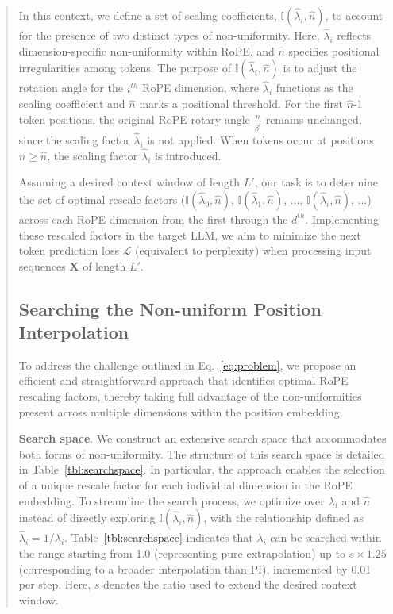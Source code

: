 \begin{abstract}
In this context, we define a set of scaling coefficients, $\mathbb{I}(\hat{\lambda}_{i},\hat{n})$, to account for the presence of two distinct types of non-uniformity. Here, $\hat{\lambda}_i$ reflects dimension-specific non-uniformity within RoPE, and $\hat{n}$ specifies positional irregularities among tokens. The purpose of $\mathbb{I}(\hat{\lambda}_{i},\hat{n})$ is to adjust the rotation angle for the $i^{th}$ RoPE dimension, where $\hat\lambda_{i}$ functions as the scaling coefficient and $\hat{n}$ marks a positional threshold. For the first $\hat{n}$-1 token positions, the original RoPE rotary angle $\frac{n}{\beta^i}$ remains unchanged, since the scaling factor $\hat\lambda_{i}$ is not applied. When tokens occur at positions $n\ge\hat{n}$, the scaling factor $\hat\lambda_{i}$ is introduced.

Assuming a desired context window of length $L'$, our task is to determine the set of optimal rescale factors ($\mathbb{I}(\hat{\lambda}_{0},\hat{n})$, $\mathbb{I}(\hat{\lambda}_{1},\hat{n})$, ..., $\mathbb{I}(\hat{\lambda}_{i},\hat{n})$, ...) across each RoPE dimension from the first through the $d^{th}$. Implementing these rescaled factors in the target $\text{LLM}$, we aim to minimize the next token prediction loss $\mathcal{L}$ (equivalent to perplexity) when processing input sequences $\mathbf{X}$ of length $L'$.

\subsection{Searching the Non-uniform Position Interpolation}

To address the challenge outlined in Eq.~\ref{eq:problem}, we propose an efficient and straightforward approach that identifies optimal RoPE rescaling factors, thereby taking full advantage of the non-uniformities present across multiple dimensions within the position embedding.

\textbf{Search space}. We construct an extensive search space that accommodates both forms of non-uniformity. The structure of this search space is detailed in Table~\ref{tbl:searchspace}. In particular, the approach enables the selection of a unique rescale factor for each individual dimension in the RoPE embedding. To streamline the search process, we optimize over $\lambda_i$ and $\hat{n}$ instead of directly exploring $\mathbb{I}(\hat{\lambda}_{i},\hat{n})$, with the relationship defined as $\hat{\lambda}_{i}=1/\lambda_i$. Table~\ref{tbl:searchspace} indicates that $\lambda_i$ can be searched within the range starting from 1.0 (representing pure extrapolation) up to $s\times1.25$ (corresponding to a broader interpolation than PI), incremented by 0.01 per step. Here, $s$ denotes the ratio used to extend the desired context window.


\end{abstract}
